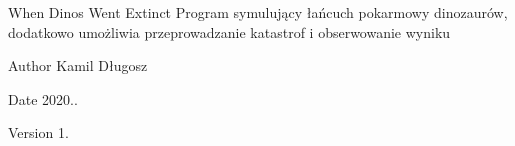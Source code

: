 \begin{DoxyParagraph}{When Dinos Went Extinct}
Program symulujący łańcuch pokarmowy dinozaurów, dodatkowo umożliwia przeprowadzanie katastrof i obserwowanie wyniku 
\end{DoxyParagraph}
\begin{DoxyAuthor}{Author}
Kamil Długosz 
\end{DoxyAuthor}
\begin{DoxyDate}{Date}
2020.. 
\end{DoxyDate}
\begin{DoxyVersion}{Version}
1. 
\end{DoxyVersion}
